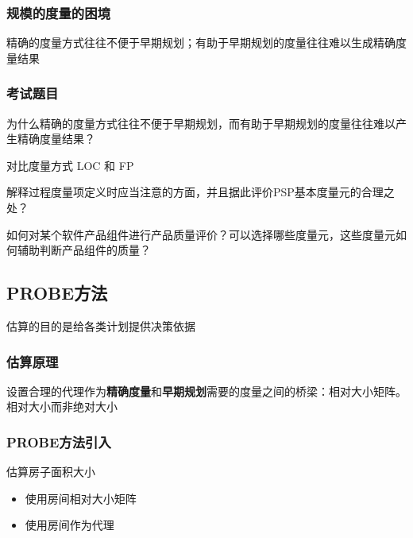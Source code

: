 \subsubsection{规模的度量的困境}
精确的度量方式往往不便于早期规划；有助于早期规划的度量往往难以生成精确度量结果

\subsubsection{考试题目}
\begin{problem}
为什么精确的度量方式往往不便于早期规划，而有助于早期规划的度量往往难以产生精确度量结果？
\end{problem}

\begin{problem}
对比度量方式 LOC 和 FP

\end{problem}

\begin{problem}
解释过程度量项定义时应当注意的方面，并且据此评价PSP基本度量元的合理之处？
\end{problem}

\begin{problem}
如何对某个软件产品组件进行产品质量评价？可以选择哪些度量元，这些度量元如何辅助判断产品组件的质量？
\end{problem}

\subsection{PROBE方法}
估算的目的是给各类计划提供决策依据

\subsubsection{估算原理}
设置合理的代理作为\textbf{精确度量}和\textbf{早期规划}需要的度量之间的桥梁：相对大小矩阵。相对大小而非绝对大小

\subsubsection{PROBE方法引入}
估算房子面积大小
\vspace{-0.8em}
\begin{multicols}{2}
    \begin{itemize}
        \item 使用房间相对大小矩阵
        \item 使用房间作为代理
    \end{itemize}
\end{multicols}
\vspace{-1em}

